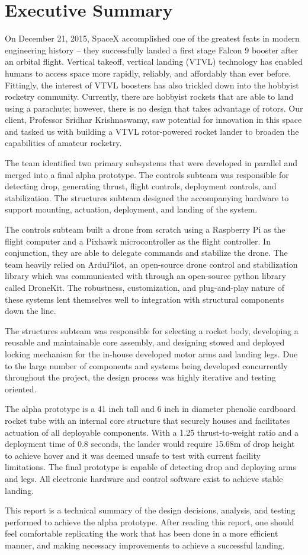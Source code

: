 \chapter{Executive Summary}
On December 21, 2015, SpaceX accomplished one of the greatest feats in modern engineering history -- they successfully landed a first stage Falcon 9 booster after an orbital flight. Vertical takeoff, vertical landing (VTVL) technology has enabled humans to access space more rapidly, reliably, and affordably than ever before. Fittingly, the interest of VTVL boosters has also trickled down into the hobbyist rocketry community. Currently, there are hobbyist rockets that are able to land using a parachute; however, there is no design that takes advantage of rotors. Our client, Professor Sridhar Krishnaswamy, saw potential for innovation in this space and tasked us with building a VTVL rotor-powered rocket lander to broaden the capabilities of amateur rocketry.

The team identified two primary subsystems that were developed in parallel and merged into a final alpha prototype. The controls subteam was responsible for detecting drop, generating thrust, flight controls, deployment controls, and stabilization. The structures subteam designed the accompanying hardware to support mounting, actuation, deployment, and landing of the system. 

The controls subteam built a drone from scratch using a Raspberry Pi as the flight computer and a Pixhawk microcontroller as the flight controller. In conjunction, they are able to delegate commands and stabilize the drone. The team heavily relied on ArduPilot, an open-source drone control and stabilization library which was communicated with through an open-source python library called DroneKit. The robustness, customization, and plug-and-play nature of these systems lent themselves well to integration with structural components down the line.

The structures subteam was responsible for selecting a rocket body, developing a reusable and maintainable core assembly, and designing stowed and deployed locking mechanism for the in-house developed motor arms and landing legs. Due to the large number of components and systems being developed concurrently throughout the project, the design process was highly iterative and testing oriented. 

The alpha prototype is a 41 inch tall and 6 inch in diameter phenolic cardboard rocket tube with an internal core structure that securely houses and facilitates actuation of all deployable components. With a 1.25 thrust-to-weight ratio and a deployment time of 0.8 seconds, the lander would require 15.68m of drop height to achieve hover and it was deemed unsafe to test with current facility limitations. The final prototype is capable of detecting drop and deploying arms and legs. All electronic hardware and control software exist to achieve stable landing.

This report is a technical summary of the design decisions, analysis, and testing performed to achieve the alpha prototype. After reading this report, one should feel comfortable replicating the work that has been done in a more efficient manner, and making necessary improvements to achieve a successful landing. 